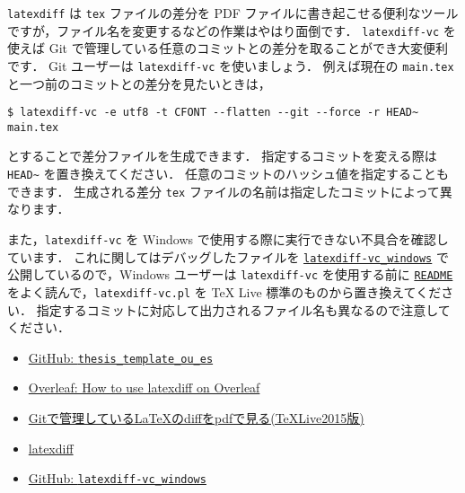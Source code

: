 \verb|latexdiff| は \verb|tex| ファイルの差分を PDF ファイルに書き起こせる便利なツールですが，ファイル名を変更するなどの作業はやはり面倒です．
\verb|latexdiff-vc| を使えば Git で管理している任意のコミットとの差分を取ることができ大変便利です．
Git ユーザーは \verb|latexdiff-vc| を使いましょう．
例えば現在の \verb|main.tex| と一つ前のコミットとの差分を見たいときは，
\begin{tcolorbox}[title={\texttt{latexdiff-vc} を使用した差分ファイルの生成方法}]
\begin{verbatim}
$ latexdiff-vc -e utf8 -t CFONT --flatten --git --force -r HEAD~ main.tex
\end{verbatim}
\end{tcolorbox}
\noindent
とすることで差分ファイルを生成できます．
指定するコミットを変える際は \verb|HEAD~| を置き換えてください．
任意のコミットのハッシュ値を指定することもできます．
生成される差分 \verb|tex| ファイルの名前は指定したコミットによって異なります．

また，\verb|latexdiff-vc| を Windows で使用する際に実行できない不具合を確認しています．
これに関してはデバッグしたファイルを \href{https://github.com/Yuki-MATSUKAWA/latexdiff-vc_windows}{\texttt{latexdiff-vc\_windows}} で公開しているので，Windows ユーザーは \verb|latexdiff-vc| を使用する前に \href{https://github.com/Yuki-MATSUKAWA/latexdiff-vc_windows?tab=readme-ov-file#readme}{\texttt{README}} をよく読んで，\verb|latexdiff-vc.pl| を TeX Live 標準のものから置き換えてください．
指定するコミットに対応して出力されるファイル名も異なるので注意してください．

\begin{tcolorbox}[title={第~\ref{ch:check}~章の参考文献}, colback=yellow!5!white, colframe=yellow!75!black, coltitle=black]
    \begin{itemize}
        \item \href{https://github.com/ryo-ARAKI/thesis_template_ou_es}{GitHub: \texttt{thesis\_template\_ou\_es}}
        \item \href{https://www.overleaf.com/learn/latex/Articles/How_to_use_latexdiff_on_Overleaf}{Overleaf: How to use latexdiff on Overleaf}
        \item \href{https://nekketsuuu.github.io/entries/2017/01/27/latexdiff-vc.html}{Gitで管理しているLaTeXのdiffをpdfで見る(TeXLive2015版)}
        \item \href{https://abenori.blogspot.com/2016/06/latexdiff.html}{latexdiff}
        \item \href{https://github.com/Yuki-MATSUKAWA/latexdiff-vc_windows}{GitHub: \texttt{latexdiff-vc\_windows}}
    \end{itemize}
\end{tcolorbox}


